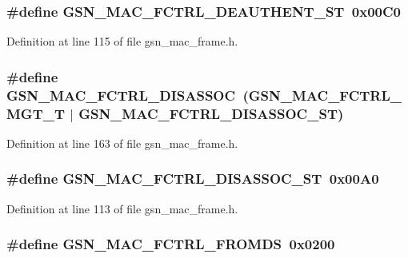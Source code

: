 \hypertarget{a00523_ae2d5c0cc41f04eaa623ec4c433fda069}{
\subsubsection[{GSN\_\-MAC\_\-FCTRL\_\-DEAUTHENT\_\-ST}]{\setlength{\rightskip}{0pt plus 5cm}\#define GSN\_\-MAC\_\-FCTRL\_\-DEAUTHENT\_\-ST~0x00C0}}
\label{a00523_ae2d5c0cc41f04eaa623ec4c433fda069}


Definition at line 115 of file gsn\_\-mac\_\-frame.h.

\hypertarget{a00523_aaf588544c26714a339e10e893ec9fd57}{
\subsubsection[{GSN\_\-MAC\_\-FCTRL\_\-DISASSOC}]{\setlength{\rightskip}{0pt plus 5cm}\#define GSN\_\-MAC\_\-FCTRL\_\-DISASSOC~(GSN\_\-MAC\_\-FCTRL\_\-MGT\_\-T     $|$ GSN\_\-MAC\_\-FCTRL\_\-DISASSOC\_\-ST)}}
\label{a00523_aaf588544c26714a339e10e893ec9fd57}


Definition at line 163 of file gsn\_\-mac\_\-frame.h.

\hypertarget{a00523_a245d69617b8e95402a80ad4d3cabb6f2}{
\subsubsection[{GSN\_\-MAC\_\-FCTRL\_\-DISASSOC\_\-ST}]{\setlength{\rightskip}{0pt plus 5cm}\#define GSN\_\-MAC\_\-FCTRL\_\-DISASSOC\_\-ST~0x00A0}}
\label{a00523_a245d69617b8e95402a80ad4d3cabb6f2}


Definition at line 113 of file gsn\_\-mac\_\-frame.h.

\hypertarget{a00523_a4af07976ca04f0c0ea1250f56bfc5189}{
\subsubsection[{GSN\_\-MAC\_\-FCTRL\_\-FROMDS}]{\setlength{\rightskip}{0pt plus 5cm}\#define GSN\_\-MAC\_\-FCTRL\_\-FROMDS~0x0200}}
\label{a00523_a4af07976ca04f0c0ea1250f56bfc5189}


